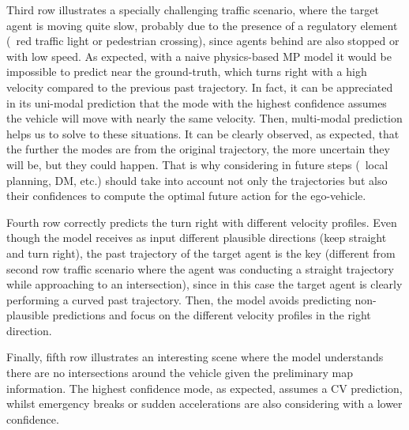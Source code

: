 Third row illustrates a specially challenging traffic scenario, where the target agent is moving quite slow, probably due to the presence of a regulatory element (\eg \ red traffic light or pedestrian crossing), since agents behind are also stopped or with low speed. As expected, with a naive physics-based \ac{MP} model it would be impossible to predict near the ground-truth, which turns right with a high velocity compared to the previous past trajectory. In fact, it can be appreciated in its uni-modal prediction that the mode with the highest confidence assumes the vehicle will move with nearly the same velocity. Then, multi-modal prediction helps us to solve to these situations. It can be clearly observed, as expected, that the further the modes are from the original trajectory, the more uncertain they will be, but they could happen. That is why considering in future steps (\eg \ local planning, \ac{DM}, etc.) should take into account not only the trajectories but also their confidences to compute the optimal future action for the ego-vehicle.

Fourth row correctly predicts the turn right with different velocity profiles. Even though the model receives as input different plausible directions (keep straight and turn right), the past trajectory of the target agent is the key (different from second row traffic scenario where the agent was conducting a straight trajectory while approaching to an intersection), since in this case the target agent is clearly performing a curved past trajectory. Then, the model avoids predicting non-plausible predictions and focus on the different velocity profiles in the right direction.

Finally, fifth row illustrates an interesting scene where the model understands there are no intersections around the vehicle given the preliminary map information. The highest confidence mode, as expected, assumes a \ac{CV} prediction, whilst emergency breaks or sudden accelerations are also considering with a lower confidence.

